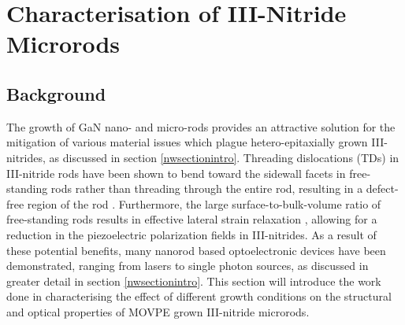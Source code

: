 
\chapter{Characterisation of III-Nitride Microrods}

\section[Background]{Background}
The growth of GaN nano- and micro-rods provides an attractive solution for the mitigation of various material issues which plague hetero-epitaxially grown III-nitrides, as discussed in section \ref{nwsectionintro}. Threading dislocations (TDs) in III-nitride rods have been shown to bend toward the sidewall facets in free-standing rods rather than threading through the entire rod, resulting in a  defect-free region of the rod \cite{Bergbauer2010,Tessarek2013}. Furthermore, the large surface-to-bulk-volume ratio of free-standing rods results in effective lateral strain relaxation \cite{Zhao2015}, allowing for a reduction in the piezoelectric polarization fields in III-nitrides. As a result of these potential benefits, many nanorod based optoelectronic devices have been demonstrated, ranging from lasers to single photon sources, as discussed in greater detail in section \ref{nwsectionintro}.
This section will introduce the work done in characterising the effect of different growth conditions on the structural and optical properties of MOVPE grown III-nitride microrods.

